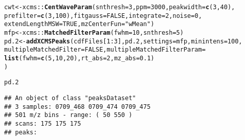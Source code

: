 \documentclass{article}\usepackage[]{graphicx}\usepackage[]{color}
\makeatletter
\newcommand{\hlnum}[1]{\textcolor[rgb]{0.686,0.059,0.569}{#1}}%
\newcommand{\hlstr}[1]{\textcolor[rgb]{0.192,0.494,0.8}{#1}}%
\newcommand{\hlopt}[1]{\textcolor[rgb]{0,0,0}{#1}}%
\newcommand{\hlstd}[1]{\textcolor[rgb]{0.345,0.345,0.345}{#1}}%
\newcommand{\hlkwb}[1]{\textcolor[rgb]{0.69,0.353,0.396}{#1}}%
\newcommand{\hlkwc}[1]{\textcolor[rgb]{0.333,0.667,0.333}{#1}}%
\newcommand{\hlkwd}[1]{\textcolor[rgb]{0.737,0.353,0.396}{\textbf{#1}}}%
\newenvironment{kframe}{%
 \def\at@end@of@kframe{}%
 \ifinner\ifhmode%
  \def\at@end@of@kframe{\end{minipage}}%
  \begin{minipage}{\columnwidth}%
 \fi\fi%
 \def\FrameCommand##1{\hskip\@totalleftmargin \hskip-\fboxsep
 \colorbox{shadecolor}{##1}\hskip-\fboxsep
     \hskip-\linewidth \hskip-\@totalleftmargin \hskip\columnwidth}%
 \MakeFramed {\advance\hsize-\width
   \@totalleftmargin\z@ \linewidth\hsize
   \@setminipage}}%
 {\par\unskip\endMakeFramed%
 \at@end@of@kframe}
\newenvironment{knitrout}{}{} %
\makeatother
\begin{document}
\begin{knitrout}
\begin{kframe}
{\ttfamily\noindent\itshape\color{messagecolor}{\#\# Create profile matrix with method 'bin' and step 1 ... OK}}\begin{alltt}
\hlstd{cwt} \hlkwb{<-} \hlstd{xcms}\hlopt{::}\hlkwd{CentWaveParam}\hlstd{(}\hlkwc{snthresh} \hlstd{=} \hlnum{3}\hlstd{,} \hlkwc{ppm} \hlstd{=} \hlnum{3000}\hlstd{,} \hlkwc{peakwidth} \hlstd{=} \hlkwd{c}\hlstd{(}\hlnum{3}\hlstd{,} \hlnum{40}\hlstd{),}
  \hlkwc{prefilter} \hlstd{=} \hlkwd{c}\hlstd{(}\hlnum{3}\hlstd{,} \hlnum{100}\hlstd{),} \hlkwc{fitgauss} \hlstd{=} \hlnum{FALSE}\hlstd{,} \hlkwc{integrate} \hlstd{=} \hlnum{2}\hlstd{,} \hlkwc{noise} \hlstd{=} \hlnum{0}\hlstd{,}
  \hlkwc{extendLengthMSW} \hlstd{=} \hlnum{TRUE}\hlstd{,} \hlkwc{mzCenterFun} \hlstd{=} \hlstr{"wMean"}\hlstd{)}
\hlstd{mfp} \hlkwb{<-} \hlstd{xcms}\hlopt{::}\hlkwd{MatchedFilterParam}\hlstd{(}\hlkwc{fwhm} \hlstd{=} \hlnum{10}\hlstd{,} \hlkwc{snthresh} \hlstd{=} \hlnum{5}\hlstd{)}
\hlstd{pd.2} \hlkwb{<-} \hlkwd{addXCMSPeaks}\hlstd{(cdfFiles[}\hlnum{1}\hlopt{:}\hlnum{3}\hlstd{], pd.2,} \hlkwc{settings} \hlstd{= mfp,} \hlkwc{minintens} \hlstd{=} \hlnum{100}\hlstd{,}
  \hlkwc{multipleMatchedFilter} \hlstd{=} \hlnum{FALSE}\hlstd{,} \hlkwc{multipleMatchedFilterParam} \hlstd{=}
  \hlkwd{list}\hlstd{(}\hlkwc{fwhm} \hlstd{=} \hlkwd{c}\hlstd{(}\hlnum{5}\hlstd{,} \hlnum{10}\hlstd{,} \hlnum{20}\hlstd{),} \hlkwc{rt_abs} \hlstd{=} \hlnum{2}\hlstd{,} \hlkwc{mz_abs} \hlstd{=} \hlnum{0.1}\hlstd{)}
  \hlstd{)}
\end{alltt}


{\ttfamily\noindent\itshape\color{messagecolor}{\#\# Create profile matrix with method 'bin' and step 1 ... OK}}

{\ttfamily\noindent\bfseries{}}\begin{alltt}
\hlstd{pd.2}
\end{alltt}
\begin{verbatim}
## An object of class "peaksDataset"
## 3 samples: 0709_468 0709_474 0709_475 
## 501 m/z bins - range: ( 50 550 )
## scans: 175 175 175 
## peaks:
\end{verbatim}
\end{kframe}
\end{knitrout}
\end{document}
